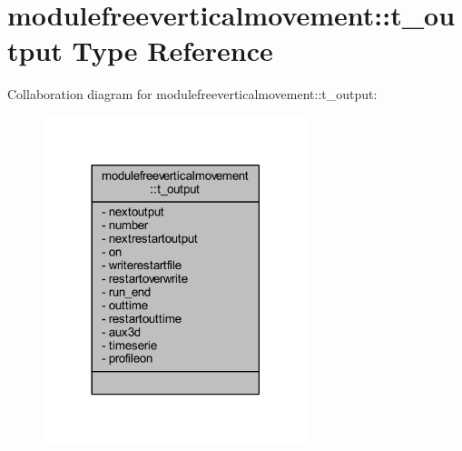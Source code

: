 \hypertarget{structmodulefreeverticalmovement_1_1t__output}{}\section{modulefreeverticalmovement\+:\+:t\+\_\+output Type Reference}
\label{structmodulefreeverticalmovement_1_1t__output}


Collaboration diagram for modulefreeverticalmovement\+:\+:t\+\_\+output\+:\nopagebreak
\begin{figure}[H]
\begin{center}
\leavevmode
\includegraphics[width=218pt]{structmodulefreeverticalmovement_1_1t__output__coll__graph}
\end{center}
\end{figure}
